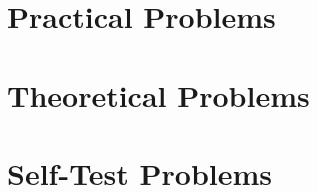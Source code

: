 \documentclass[twocolumn]{article}
\begin{document}
\section*{Practical Problems}

\section*{Theoretical Problems}
    
\section*{Self-Test Problems}
\end{document}
